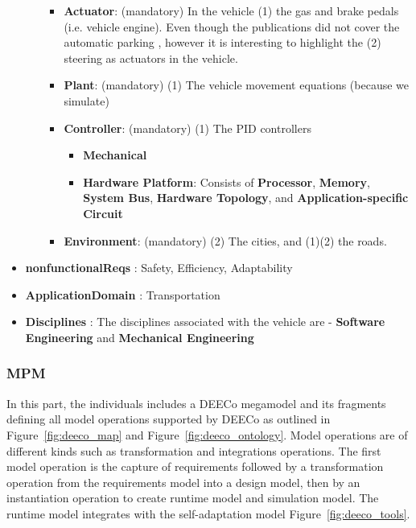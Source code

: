 \begin{itemize}
\begin{itemize}
\begin{itemize}
            \item \checkmark \textbf{Actuator}: (mandatory) In the vehicle (1) the gas and brake pedals (i.e. vehicle engine). Even though the publications did not cover the automatic parking , however it is interesting to highlight the (2) steering as actuators in the vehicle.
            \item \checkmark \textbf{Plant}: (mandatory) (1) The vehicle movement equations (because we simulate)
            \item \checkmark \textbf{Controller}: (mandatory) (1) The PID controllers
            \begin{itemize}
                \item \xmark \textbf{Mechanical}
                \item \checkmark \textbf{Hardware Platform}: Consists of \textbf{Processor}, \textbf{Memory}, \textbf{System Bus}, \textbf{Hardware Topology}, and \textbf{Application-specific Circuit}
            \end{itemize}
            \item \checkmark \textbf{Environment}: (mandatory) (2) The cities, and (1)(2) the roads. 
        \end{itemize}
    \end{itemize}
    \item \checkmark \textbf{nonfunctionalReqs} :  Safety, Efficiency, Adaptability
    \item \checkmark \textbf{ApplicationDomain} :  Transportation
    \item \checkmark \textbf{Disciplines} : The disciplines associated with the vehicle are - \textbf{Software Engineering} and \textbf{Mechanical Engineering} 
\end{itemize}
 

 \subsubsection{MPM}
  In this part, the individuals includes a DEECo megamodel and its fragments defining all model operations supported by DEECo as outlined in Figure~\ref{fig:deeco_map} and Figure~\ref{fig:deeco_ontology}. Model operations are of different kinds such as transformation and integrations operations. The first model operation is the capture of requirements followed by a transformation operation from the requirements model into a design model, then by an instantiation operation to create runtime model and simulation model. The runtime model integrates with the self-adaptation model Figure~\ref{fig:deeco_tools}.

